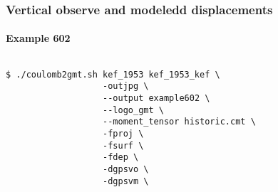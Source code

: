 \begin{frame}[t,fragile]
  \frametitle{Vertical observe and modeledd displacements}
  \framesubtitle{Example 602}
  \label{ch5fr:ex602}
\begin{columns}[t]
  \begin{column}{.5\textwidth}
\begin{scriptsize}
\begin{verbatim}
$ ./coulomb2gmt.sh kef_1953 kef_1953_kef \
                   -outjpg \ 
                   --output example602 \
                   --logo_gmt \
                   --moment_tensor historic.cmt \
                   -fproj \
                   -fsurf \
                   -fdep \
                   -dgpsvo \
                   -dgpsvm \ 
\end{verbatim}
\end{scriptsize}

  \end{column}
  \begin{column}{.5\textwidth}

\centering
  \end{column}
\end{columns}

\end{frame}
\note{}
